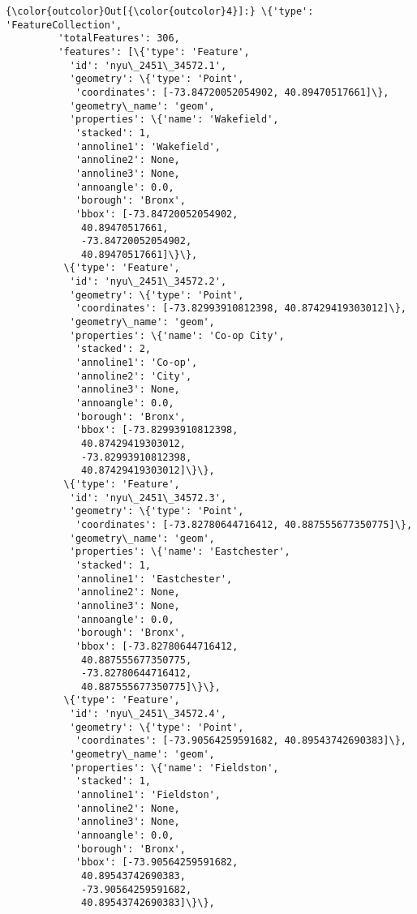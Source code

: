 \documentclass[11pt]{article}
\begin{document}
\begin{Verbatim}[commandchars=\\\{\}]
{\color{outcolor}Out[{\color{outcolor}4}]:} \{'type': 'FeatureCollection',
         'totalFeatures': 306,
         'features': [\{'type': 'Feature',
           'id': 'nyu\_2451\_34572.1',
           'geometry': \{'type': 'Point',
            'coordinates': [-73.84720052054902, 40.89470517661]\},
           'geometry\_name': 'geom',
           'properties': \{'name': 'Wakefield',
            'stacked': 1,
            'annoline1': 'Wakefield',
            'annoline2': None,
            'annoline3': None,
            'annoangle': 0.0,
            'borough': 'Bronx',
            'bbox': [-73.84720052054902,
             40.89470517661,
             -73.84720052054902,
             40.89470517661]\}\},
          \{'type': 'Feature',
           'id': 'nyu\_2451\_34572.2',
           'geometry': \{'type': 'Point',
            'coordinates': [-73.82993910812398, 40.87429419303012]\},
           'geometry\_name': 'geom',
           'properties': \{'name': 'Co-op City',
            'stacked': 2,
            'annoline1': 'Co-op',
            'annoline2': 'City',
            'annoline3': None,
            'annoangle': 0.0,
            'borough': 'Bronx',
            'bbox': [-73.82993910812398,
             40.87429419303012,
             -73.82993910812398,
             40.87429419303012]\}\},
          \{'type': 'Feature',
           'id': 'nyu\_2451\_34572.3',
           'geometry': \{'type': 'Point',
            'coordinates': [-73.82780644716412, 40.887555677350775]\},
           'geometry\_name': 'geom',
           'properties': \{'name': 'Eastchester',
            'stacked': 1,
            'annoline1': 'Eastchester',
            'annoline2': None,
            'annoline3': None,
            'annoangle': 0.0,
            'borough': 'Bronx',
            'bbox': [-73.82780644716412,
             40.887555677350775,
             -73.82780644716412,
             40.887555677350775]\}\},
          \{'type': 'Feature',
           'id': 'nyu\_2451\_34572.4',
           'geometry': \{'type': 'Point',
            'coordinates': [-73.90564259591682, 40.89543742690383]\},
           'geometry\_name': 'geom',
           'properties': \{'name': 'Fieldston',
            'stacked': 1,
            'annoline1': 'Fieldston',
            'annoline2': None,
            'annoline3': None,
            'annoangle': 0.0,
            'borough': 'Bronx',
            'bbox': [-73.90564259591682,
             40.89543742690383,
             -73.90564259591682,
             40.89543742690383]\}\},

\end{Verbatim}
\end{document}
